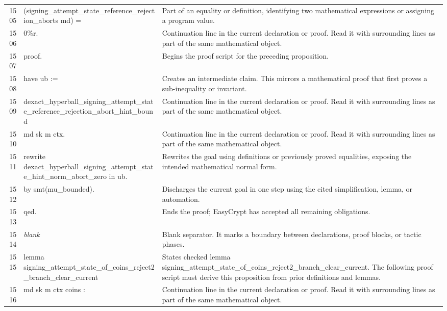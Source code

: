 \documentclass[10pt]{article}
\begin{document}
\begin{longtable}{r L{0.53\textwidth} L{0.37\textwidth}}
1505 & {\ttfamily\scriptsize     (signing\_attempt\_state\_reference\_rejection\_aborts md) =} & Part of an equality or definition, identifying two mathematical expressions or assigning a program value. \\
1506 & {\ttfamily\scriptsize   0\%r.} & Continuation line in the current declaration or proof.  Read it with surrounding lines as part of the same mathematical object. \\
1507 & {\ttfamily\scriptsize proof.} & Begins the proof script for the preceding proposition. \\
1508 & {\ttfamily\scriptsize have ub :=} & Creates an intermediate claim.  This mirrors a mathematical proof that first proves a sub-inequality or invariant. \\
1509 & {\ttfamily\scriptsize   dexact\_hyperball\_signing\_attempt\_state\_reference\_rejection\_abort\_hint\_bound} & Continuation line in the current declaration or proof.  Read it with surrounding lines as part of the same mathematical object. \\
1510 & {\ttfamily\scriptsize     md sk m ctx.} & Continuation line in the current declaration or proof.  Read it with surrounding lines as part of the same mathematical object. \\
1511 & {\ttfamily\scriptsize rewrite dexact\_hyperball\_signing\_attempt\_state\_hint\_norm\_abort\_zero in ub.} & Rewrites the goal using definitions or previously proved equalities, exposing the intended mathematical normal form. \\
1512 & {\ttfamily\scriptsize by smt(mu\_bounded).} & Discharges the current goal in one step using the cited simplification, lemma, or automation. \\
1513 & {\ttfamily\scriptsize qed.} & Ends the proof; EasyCrypt has accepted all remaining obligations. \\
1514 & {\ttfamily\scriptsize \emph{blank}} & Blank separator.  It marks a boundary between declarations, proof blocks, or tactic phases. \\
1515 & {\ttfamily\scriptsize lemma signing\_attempt\_state\_of\_coins\_reject2\_branch\_clear\_current} & States checked lemma signing\_attempt\_state\_of\_coins\_reject2\_branch\_clear\_current.  The following proof script must derive this proposition from prior definitions and lemmas. \\
1516 & {\ttfamily\scriptsize    md sk m ctx coins :} & Continuation line in the current declaration or proof.  Read it with surrounding lines as part of the same mathematical object. \\

\end{longtable}
\end{document}
